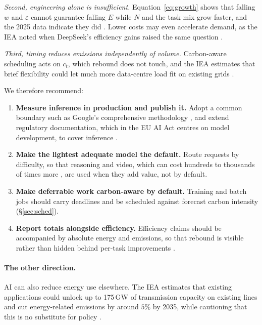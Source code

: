 \documentclass[11pt]{article}
\theoremstyle{definition}
\theoremstyle{remark}
\begin{document}
\emph{Second, engineering alone is insufficient.} Equation~\eqref{eq:growth} shows that falling $w$ and $\varepsilon$ cannot guarantee falling $E$ while $N$ and the task mix grow faster, and the 2025 data indicate they did \citep{iea2026}. Lower costs may even accelerate demand, as the IEA noted when DeepSeek's efficiency gains raised the same question \citep{iea2025}.

\emph{Third, timing reduces emissions independently of volume.} Carbon-aware scheduling acts on $c_t$, which rebound does not touch, and the IEA estimates that brief flexibility could let much more data-centre load fit on existing grids \citep{iea2025}.

We therefore recommend:
\begin{enumerate}[leftmargin=*,itemsep=2pt]
  \item \textbf{Measure inference in production and publish it.} Adopt a common boundary such as Google's comprehensive methodology \citep{elsworth2025}, and extend regulatory documentation, which in the EU AI Act centres on model development, to cover inference \citep{euaiact}.
  \item \textbf{Make the lightest adequate model the default.} Route requests by difficulty, so that reasoning and video, which can cost hundreds to thousands of times more \citep{iea2026}, are used when they add value, not by default.
  \item \textbf{Make deferrable work carbon-aware by default.} Training and batch jobs should carry deadlines and be scheduled against forecast carbon intensity (\S\ref{sec:sched}).
  \item \textbf{Report totals alongside efficiency.} Efficiency claims should be accompanied by absolute energy and emissions, so that rebound is visible rather than hidden behind per-task improvements \citep{luccioni2025jevons}.
\end{enumerate}

\paragraph{The other direction.} AI can also reduce energy use elsewhere. The IEA estimates that existing applications could unlock up to 175\,GW of transmission capacity on existing lines and cut energy-related emissions by around $5\%$ by 2035, while cautioning that this is no substitute for policy \citep{iea2025}.

\end{document}
